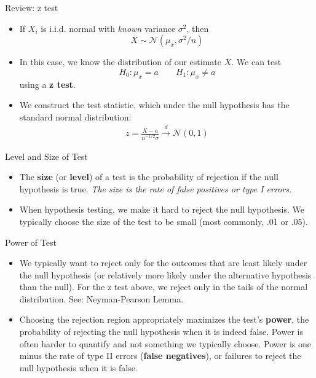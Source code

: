 \begin{frame}{Review: z test}
\begin{itemize}
	\item If $X_i$ is i.i.d. normal with \emph{known} variance $\sigma^2$, then \[
		\overline{X} \sim \mathcal{N} \left( \mu_x, \sigma^{2}/n \right)
	\]


	\item In this case, we know the distribution of our estimate $\overline{X}$. We can test\[
H_{0}:\mu_{x}=a \qquad H_{1}:\mu_{x}\ne a
\]
using a {\bf z test}.

	\item We construct the test statistic, which under the null hypothesis has the standard normal distribution:
	\begin{align*}		z = \frac{ \overline{X} - a}{n^{-1/2}\sigma}
	 \overset{d}{\to} \mathcal{N} \left( 0,1\right)
	 \end{align*}
\end{itemize}
\end{frame}



\begin{frame}{Level and Size of Test}
\begin{itemize}
	\item The {\bf size} (or {\bf level}) of a test is the probability of rejection if the null hypothesis is true. 
	\emph{The size is the rate of false positives or type I errors.}

	\item When hypothesis testing, we make it hard to reject the null hypothesis. We typically choose the 
	size of the test to be small (most commonly, .01 or .05).

\end{itemize}
\end{frame}




\begin{frame}{Power of Test}
\begin{itemize}

	\item We typically want to reject only for the outcomes that are least likely under the null
	hypothesis (or relatively more likely under the alternative hypothesis than the null). For
	the z test above, we reject only in the tails of the normal distribution. See: Neyman-Pearson Lemma.
	
	\medskip
	\item Choosing the rejection region appropriately maximizes the test's {\bf power}, the 
	probability of rejecting the null hypothesis when it is indeed false. Power is often harder
	to quantify and not something we typically choose. Power is one minus the rate of
	type II errors (\textbf{false negatives}), or failures to reject the null hypothesis when it is false. 
\end{itemize}
\end{frame}



